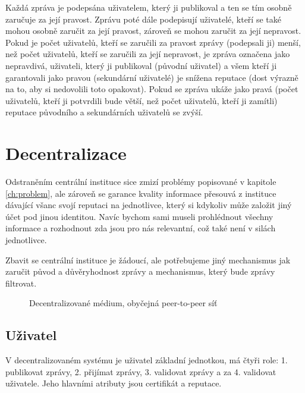 \documentclass[a4papper]{article}
\begin{document}
Každá zpráva je podepsána uživatelem, který ji publikoval a ten se tím osobně zaručuje za její pravost. Zprávu poté dále podepisují uživatelé, kteří se také mohou osobně zaručit za její pravost, zároveň se mohou zaručit za její nepravost. Pokud je počet uživatelů, kteří se zaručili za pravost zprávy (podepsali ji) menší, než počet uživatelů, kteří se zaručili za její nepravost, je zpráva označena jako nepravdivá, uživateli, který ji publikoval (původní uživatel) a všem kteří ji garantovali jako pravou (sekundární uživatelé) je snížena reputace (dost výrazně na to, aby si nedovolili toto opakovat). Pokud se zpráva ukáže jako pravá (počet uživatelů, kteří ji potvrdili bude větší, než počet uživatelů, kteří ji zamítli) reputace původního a sekundárních uživatelů se zvýší.

\section{Decentralizace}
\label{sec:decentralizace}
Odstraněním centrální instituce sice zmizí problémy popisované v kapitole \ref{ch:problem}, ale zároveň se garance kvality informace přesouvá z instituce dávající všanc svojí reputaci na jednotlivce, který si kdykoliv může založit jiný účet pod jinou identitou. Navíc bychom sami museli prohlédnout všechny informace a rozhodnout zda jsou pro nás relevantní, což také není v silách jednotlivce. \citep{netanel01}

Zbavit se centrální instituce je žádoucí, ale potřebujeme jiný mechanismus jak zaručit původ a důvěryhodnost zprávy a mechanismus, který bude zprávy filtrovat.

\begin{figure}[!ht]
\centering
{}
\caption{Decentralizované médium, obyčejná peer-to-peer síť}
\end{figure}

\subsection{Uživatel}
\label{sec:uzivatel}
V decentralizovaném systému je uživatel základní jednotkou, má čtyři role: 1. publikovat zprávy, 2. přijímat zprávy, 3. validovat zprávy a za 4. validovat uživatele. Jeho hlavními atributy jsou certifikát a reputace.
\end{document}
